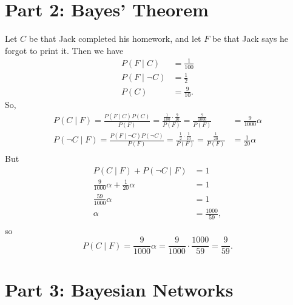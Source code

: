 \documentclass[11pt]{amsart}
\begin{document}
\section*{Part 2: Bayes' Theorem}

Let $C$ be that Jack completed his homework, and let $F$ be that Jack says he forgot to print it.  Then we have
\begin{align*}
P(F \mid C) &= \frac{1}{100} \\
P(F \mid \neg C) &= \frac{1}{2} \\
P(C) &= \frac{9}{10}.
\end{align*}
So,
\begin{align*}
P(C \mid F) = \frac{P(F \mid C)P(C)}{P(F)} = \frac{\frac{1}{100}\cdot\frac{9}{10}}{P(F)} = \frac{\frac{9}{1000}}{P(F)} &=
\frac{9}{1000}\alpha \\
P(\neg C \mid F) = \frac{P(F \mid \neg C)P(\neg C)}{P(F)} = \frac{\frac{1}{2}\cdot\frac{1}{10}}{P(F)} =
\frac{\frac{1}{20}}{P(F)} &= \frac{1}{20}\alpha \\
\end{align*}
But
\begin{align*}
P(C \mid F) + P(\neg C \mid F) &= 1 \\
\frac{9}{1000}\alpha + \frac{1}{20}\alpha &= 1 \\
\frac{59}{1000}\alpha &= 1 \\
\alpha &= \frac{1000}{59}, \\
\end{align*}
so
\[
P(C \mid F) = \frac{9}{1000}\alpha = \frac{9}{1000}\cdot\frac{1000}{59} = \frac{9}{59}.
\]

\section*{Part 3: Bayesian Networks}
\end{document}
